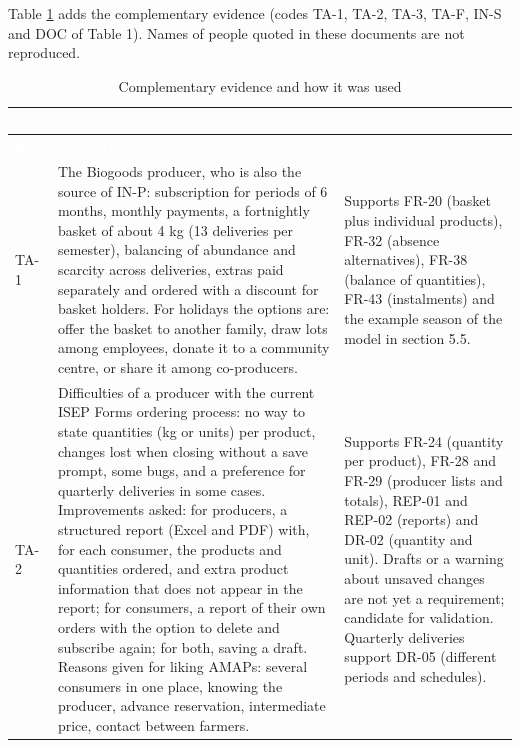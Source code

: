 \documentclass[11pt,a4paper]{article}
\begin{document}
Table \ref{tab:complementary} adds the complementary evidence (codes TA-1, TA-2, TA-3, TA-F, IN-S and DOC of Table 1). Names of people quoted in these documents are not reproduced.

{\footnotesize
\begin{longtable}{>{\raggedright\arraybackslash\hspace{0pt}}p{}>{\raggedright\arraybackslash\hspace{0pt}}p{}>{\raggedright\arraybackslash\hspace{0pt}}p{}}
\caption{Complementary evidence and how it was used}\label{tab:complementary}\\
\rowcolor{hdr}\textcolor{white}{\textbf{Ref.}} & \textcolor{white}{\textbf{What the document shows}} & \textcolor{white}{\textbf{Use in this SRS}} \\ \endfirsthead
\rowcolor{hdr}\textcolor{white}{\textbf{Ref.}} & \textcolor{white}{\textbf{What the document shows}} & \textcolor{white}{\textbf{Use in this SRS}} \\ \endhead
TA-1 & The Biogoods producer, who is also the source of IN-P: subscription for periods of 6 months, monthly payments, a fortnightly basket of about 4 kg (13 deliveries per semester), balancing of abundance and scarcity across deliveries, extras paid separately and ordered with a discount for basket holders. For holidays the options are: offer the basket to another family, draw lots among employees, donate it to a community centre, or share it among co-producers. & Supports FR-20 (basket plus individual products), FR-32 (absence alternatives), FR-38 (balance of quantities), FR-43 (instalments) and the example season of the model in section 5.5. \\ \hline
TA-2 & Difficulties of a producer with the current ISEP Forms ordering process: no way to state quantities (kg or units) per product, changes lost when closing without a save prompt, some bugs, and a preference for quarterly deliveries in some cases. Improvements asked: for producers, a structured report (Excel and PDF) with, for each consumer, the products and quantities ordered, and extra product information that does not appear in the report; for consumers, a report of their own orders with the option to delete and subscribe again; for both, saving a draft. Reasons given for liking AMAPs: several consumers in one place, knowing the producer, advance reservation, intermediate price, contact between farmers. & Supports FR-24 (quantity per product), FR-28 and FR-29 (producer lists and totals), REP-01 and REP-02 (reports) and DR-02 (quantity and unit). Drafts or a warning about unsaved changes are not yet a requirement; candidate for validation. Quarterly deliveries support DR-05 (different periods and schedules). \\ \hline

\end{longtable}}
\end{document}
